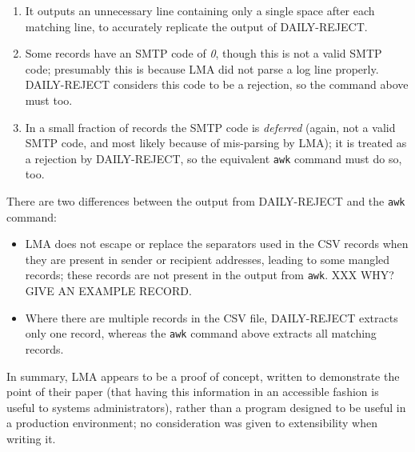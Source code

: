 \begin{enumerate}

    \item It outputs an unnecessary line containing only a single space
        after each matching line, to accurately replicate the output of
        DAILY-REJECT\@.

    \item Some records have an \gls{SMTP} code of \textit{0}, though this
        is not a valid \gls{SMTP} code; presumably this is because
        \gls{LMA} did not parse a log line properly.  DAILY-REJECT
        considers this code to be a rejection, so the command above must
        too.

    \item In a small fraction of records the \gls{SMTP} code is
        \textit{deferred\/} (again, not a valid \gls{SMTP} code, and most
        likely because of mis-parsing by \gls{LMA}); it is treated as a
        rejection by DAILY-REJECT, so the equivalent \texttt{awk} command
        must do so, too.

\end{enumerate}

There are two differences between the output from DAILY-REJECT and the
\texttt{awk} command:

\begin{itemize}

    \item \gls{LMA} does not escape or replace the separators used in the
        \gls{CSV} records when they are present in sender or recipient
        addresses, leading to some mangled records; these records are not
        present in the output from \texttt{awk}.  XXX WHY\@?  GIVE AN
        EXAMPLE RECORD\@.

    \item Where there are multiple records in the \gls{CSV} file,
        DAILY-REJECT extracts only one record, whereas the \texttt{awk}
        command above extracts all matching records.

\end{itemize}

In summary, \gls{LMA} appears to be a proof of concept, written to
demonstrate the point of their paper (that having this information in an
accessible fashion is useful to systems administrators), rather than a
program designed to be useful in a production environment; no consideration
was given to extensibility when writing it.

